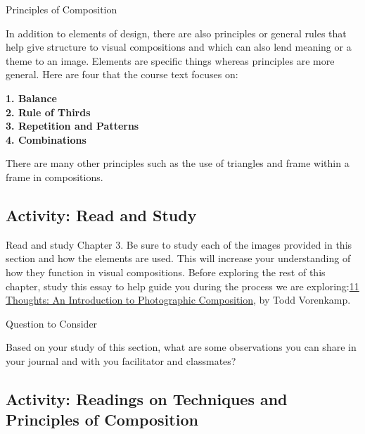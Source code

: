 \documentclass[
]{book}
\begin{document}
{Principles of Composition}

In addition to elements of design, there are also principles or general rules that help give structure to visual compositions and which can also lend meaning or a theme to an image. Elements are specific things whereas principles are more general. Here are four that the course text focuses on:

\textbf{1. Balance}\\
\textbf{2. Rule of Thirds}\\
\textbf{3. Repetition and Patterns}\\
\textbf{4. Combinations}

There are many other principles such as the use of triangles and frame within a frame in compositions.

\hypertarget{activity-read-and-study}{%
\subsection*{Activity: Read and Study}\label{activity-read-and-study}}

\begin{reflect}
Read and study Chapter 3. Be sure to study each of the images provided in this section and how the elements are used. This will increase your understanding of how they function in visual compositions.
Before exploring the rest of this chapter, study this essay to help guide you during the process we are exploring:\href{https://www.bhphotovideo.com/explora/photography/tips-and-solutions/11-thoughts-introduction-photographic-composition}{11 Thoughts: An Introduction to Photographic Composition}, by Todd Vorenkamp.

{Question to Consider}

Based on your study of this section, what are some observations you can share in your journal and with you facilitator and classmates?
\end{reflect}

\hypertarget{activity-readings-on-techniques-and-principles-of-composition}{%
\subsection*{Activity: Readings on Techniques and Principles of Composition}\label{activity-readings-on-techniques-and-principles-of-composition}}
\end{document}
